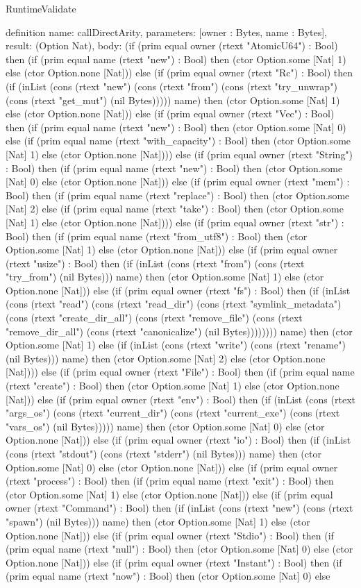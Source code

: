 \begin{lexlean}{RuntimeValidate}
\begin{semanticmodule}
definition{
  name: callDirectArity,
  parameters: [owner : Bytes, name : Bytes],
  result: (Option Nat),
  body: (if (prim equal owner (rtext "AtomicU64") : Bool) then (if (prim equal name (rtext "new") : Bool) then (ctor Option.some [Nat] 1) else (ctor Option.none [Nat])) else (if (prim equal owner (rtext "Rc") : Bool) then (if (inList (cons (rtext "new") (cons (rtext "from") (cons (rtext "try_unwrap") (cons (rtext "get_mut") (nil Bytes))))) name) then (ctor Option.some [Nat] 1) else (ctor Option.none [Nat])) else (if (prim equal owner (rtext "Vec") : Bool) then (if (prim equal name (rtext "new") : Bool) then (ctor Option.some [Nat] 0) else (if (prim equal name (rtext "with_capacity") : Bool) then (ctor Option.some [Nat] 1) else (ctor Option.none [Nat]))) else (if (prim equal owner (rtext "String") : Bool) then (if (prim equal name (rtext "new") : Bool) then (ctor Option.some [Nat] 0) else (ctor Option.none [Nat])) else (if (prim equal owner (rtext "mem") : Bool) then (if (prim equal name (rtext "replace") : Bool) then (ctor Option.some [Nat] 2) else (if (prim equal name (rtext "take") : Bool) then (ctor Option.some [Nat] 1) else (ctor Option.none [Nat]))) else (if (prim equal owner (rtext "str") : Bool) then (if (prim equal name (rtext "from_utf8") : Bool) then (ctor Option.some [Nat] 1) else (ctor Option.none [Nat])) else (if (prim equal owner (rtext "usize") : Bool) then (if (inList (cons (rtext "from") (cons (rtext "try_from") (nil Bytes))) name) then (ctor Option.some [Nat] 1) else (ctor Option.none [Nat])) else (if (prim equal owner (rtext "fs") : Bool) then (if (inList (cons (rtext "read") (cons (rtext "read_dir") (cons (rtext "symlink_metadata") (cons (rtext "create_dir_all") (cons (rtext "remove_file") (cons (rtext "remove_dir_all") (cons (rtext "canonicalize") (nil Bytes)))))))) name) then (ctor Option.some [Nat] 1) else (if (inList (cons (rtext "write") (cons (rtext "rename") (nil Bytes))) name) then (ctor Option.some [Nat] 2) else (ctor Option.none [Nat]))) else (if (prim equal owner (rtext "File") : Bool) then (if (prim equal name (rtext "create") : Bool) then (ctor Option.some [Nat] 1) else (ctor Option.none [Nat])) else (if (prim equal owner (rtext "env") : Bool) then (if (inList (cons (rtext "args_os") (cons (rtext "current_dir") (cons (rtext "current_exe") (cons (rtext "vars_os") (nil Bytes))))) name) then (ctor Option.some [Nat] 0) else (ctor Option.none [Nat])) else (if (prim equal owner (rtext "io") : Bool) then (if (inList (cons (rtext "stdout") (cons (rtext "stderr") (nil Bytes))) name) then (ctor Option.some [Nat] 0) else (ctor Option.none [Nat])) else (if (prim equal owner (rtext "process") : Bool) then (if (prim equal name (rtext "exit") : Bool) then (ctor Option.some [Nat] 1) else (ctor Option.none [Nat])) else (if (prim equal owner (rtext "Command") : Bool) then (if (inList (cons (rtext "new") (cons (rtext "spawn") (nil Bytes))) name) then (ctor Option.some [Nat] 1) else (ctor Option.none [Nat])) else (if (prim equal owner (rtext "Stdio") : Bool) then (if (prim equal name (rtext "null") : Bool) then (ctor Option.some [Nat] 0) else (ctor Option.none [Nat])) else (if (prim equal owner (rtext "Instant") : Bool) then (if (prim equal name (rtext "now") : Bool) then (ctor Option.some [Nat] 0) else }
\end{semanticmodule}
\end{lexlean}
